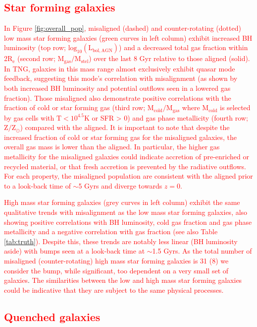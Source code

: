 \documentclass[fleqn,usenatbib]{mnras}
\newcommand{\red}[1]{{\textcolor{red}{#1}}}
\begin{document}
\subsection{\red{Star forming galaxies}}

\red{In Figure \ref{fig:overall_pop}, misaligned (dashed) and counter-rotating (dotted) low mass star forming galaxies (green curves in left column) exhibit increased BH luminosity (top row; $\mathrm{log_{10}(L_{bol, AGN})}$) and a decreased total gas fraction within 2$\mathrm{R_{e}}$ (second row; $\mathrm{M_{gas} / M_{stel}}$) over the last 8 Gyr relative to those aligned (solid). In TNG, galaxies in this mass range almost exclusively exhibit quasar mode feedback, suggesting this mode's correlation with misalignment (as shown by both increased BH luminosity and potential outflows seen in a lowered gas fraction). Those misaligned also demonstrate positive correlations with the fraction of cold or star forming gas (third row; $\mathrm{M_{cold} / M_{gas}}$ where $\mathrm{M_{cold}}$ is selected by gas cells with $\mathrm{T < 10^{4.5}K}$ or SFR > 0) and gas phase metallicity (fourth row; $\mathrm{Z / Z_{\odot}}$) compared with the aligned. 
It is important to note that despite the increased fraction of cold or star forming gas for the misaligned galaxies, the overall gas mass is lower than the aligned. In particular, the higher gas metallicity for the misaligned galaxies could indicate accretion of pre-enriched or recycled material, or that fresh accretion is prevented by the radiative outflows. 
For each property, the misaligned population are consistent with the aligned prior to a look-back time of $\sim$5 Gyrs and diverge towards $z=0$.}

\red{High mass star forming galaxies (grey curves in left column) exhibit the same qualitative trends with misalignment as the low mass star forming galaxies, also showing positive correlations with BH luminosity, cold gas fraction and gas phase metallicity and a negative correlation with gas fraction (see also Table \ref{tab:truth}). Despite this, these trends are notably less linear (BH luminosity aside) with bumps seen at a look-back time at $\sim$1.5 Gyrs. As the total number of misaligned (counter-rotating) high mass star forming galaxies is 31 (8) we consider the bump, while significant, too dependent on a very small set of galaxies}. \red{The similarities between the low and high mass star forming galaxies could be indicative that they are subject to the same physical processes.} 

\subsection{\red{Quenched galaxies}}
\end{document}
